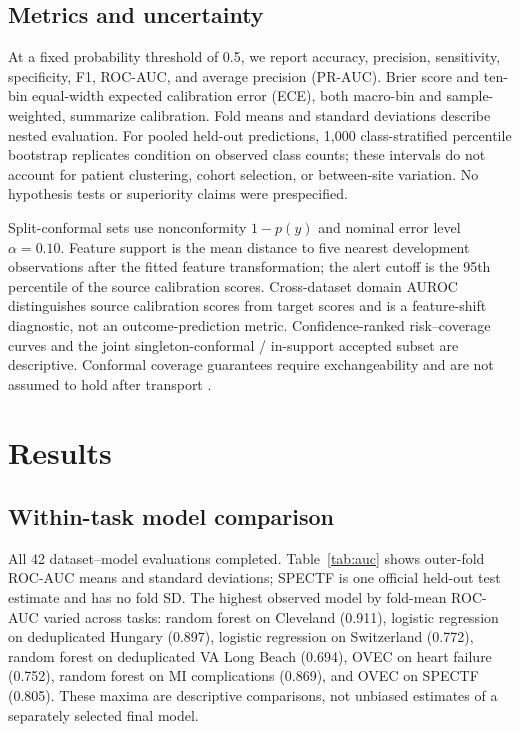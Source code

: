 \documentclass[conference]{IEEEtran}
\begin{document}
\subsection{Metrics and uncertainty}
At a fixed probability threshold of 0.5, we report accuracy, precision, sensitivity, specificity, F1, ROC-AUC, and average precision (PR-AUC). Brier score and ten-bin equal-width expected calibration error (ECE), both macro-bin and sample-weighted, summarize calibration. Fold means and standard deviations describe nested evaluation. For pooled held-out predictions, 1,000 class-stratified percentile bootstrap replicates condition on observed class counts; these intervals do not account for patient clustering, cohort selection, or between-site variation. No hypothesis tests or superiority claims were prespecified.

Split-conformal sets use nonconformity $1-p(y)$ and nominal error level $\alpha=0.10$. Feature support is the mean distance to five nearest development observations after the fitted feature transformation; the alert cutoff is the 95th percentile of the source calibration scores. Cross-dataset domain AUROC distinguishes source calibration scores from target scores and is a feature-shift diagnostic, not an outcome-prediction metric. Confidence-ranked risk--coverage curves and the joint singleton-conformal / in-support accepted subset are descriptive. Conformal coverage guarantees require exchangeability and are not assumed to hold after transport \cite{angelopoulos2023conformal}.

\section{Results}
\subsection{Within-task model comparison}
All 42 dataset--model evaluations completed. Table~\ref{tab:auc} shows outer-fold ROC-AUC means and standard deviations; SPECTF is one official held-out test estimate and has no fold SD. The highest observed model by fold-mean ROC-AUC varied across tasks: random forest on Cleveland (0.911), logistic regression on deduplicated Hungary (0.897), logistic regression on Switzerland (0.772), random forest on deduplicated VA Long Beach (0.694), OVEC on heart failure (0.752), random forest on MI complications (0.869), and OVEC on SPECTF (0.805). These maxima are descriptive comparisons, not unbiased estimates of a separately selected final model.
\end{document}
